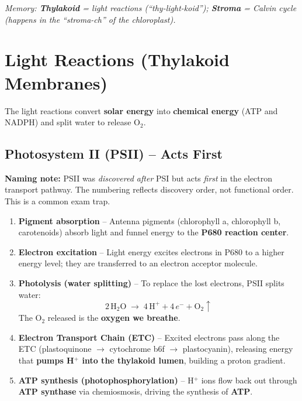 \documentclass[11pt, letterpaper]{article}
\begin{document}
\textit{Memory: \textbf{Thylakoid} = light reactions (``thy-light-koid''); \textbf{Stroma} = Calvin cycle (happens in the ``stroma-ch'' of the chloroplast).}

\section*{Light Reactions (Thylakoid Membranes)}

The light reactions convert \textbf{solar energy} into \textbf{chemical energy} (ATP and NADPH) and split water to release O$_2$.

\subsection*{Photosystem II (PSII) -- Acts First}

\begin{tcolorbox}[colback=part2bg, colframe=sectiongreen, arc=3pt, boxrule=1pt]
\textbf{Naming note:} PSII was \emph{discovered after} PSI but acts \emph{first} in the electron transport pathway. The numbering reflects discovery order, not functional order. This is a common exam trap.
\end{tcolorbox}

\begin{enumerate}[noitemsep]
  \item \textbf{Pigment absorption} -- Antenna pigments (chlorophyll a, chlorophyll b, carotenoids) absorb light and funnel energy to the \textbf{P680 reaction center}.
  \item \textbf{Electron excitation} -- Light energy excites electrons in P680 to a higher energy level; they are transferred to an electron acceptor molecule.
  \item \textbf{Photolysis (water splitting)} -- To replace the lost electrons, PSII splits water:
  \[
    2\,\text{H}_2\text{O} \;\longrightarrow\; 4\,\text{H}^+ + 4\,e^- + \text{O}_2\uparrow
  \]
  The O$_2$ released is the \textbf{oxygen we breathe}.
  \item \textbf{Electron Transport Chain (ETC)} -- Excited electrons pass along the ETC (plastoquinone $\to$ cytochrome b6f $\to$ plastocyanin), releasing energy that \textbf{pumps H$^+$ into the thylakoid lumen}, building a proton gradient.
  \item \textbf{ATP synthesis (photophosphorylation)} -- H$^+$ ions flow back out through \textbf{ATP synthase} via chemiosmosis, driving the synthesis of \textbf{ATP}.
\end{enumerate}
\end{document}
